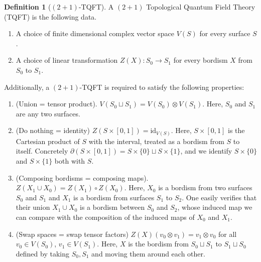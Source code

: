 \documentclass{article}
\theoremstyle{definition}
\newtheorem*{definition}{Definition}
\numberwithin{figure}{section}
\begin{document}
\begin{definition}[$(2+1)$-TQFT] A $(2+1)$ Topological Quantum Field Theory (TQFT) is the following data.
\begin{enumerate}
\item A choice of finite dimensional complex vector space $V(S)$ for every surface $S$.
\item A choice of linear transformation $Z(X): S_0\xrightarrow{} S_1$ for every bordism $X$ from $S_0$ to $S_1$.
\end{enumerate}
Additionally, a $(2+1)$-TQFT is required to satisfy the following properties:
\begin{enumerate}

\item (Union = tensor product). $V(S_0\sqcup S_1)=V(S_0)\otimes V(S_1)$. Here, $S_0$ and $S_1$ are any two surfaces.

\item (Do nothing = identity) $Z(S\times [0,1])=\text{id}_{V(S)}$. Here, $S\times [0,1]$ is the Cartesian product of $S$ with the interval, treated as a bordism from $S$ to itself. Concretely $\partial (S\times [0,1])=S\times\{0\}\sqcup S\times\{1\}$, and we identify $S\times \{0\}$ and $S\times\{1\}$ both with $S$.

\item (Composing bordisms = composing maps). $Z(X_1\cup X_0)=Z(X_1)\circ Z(X_0)$. Here, $X_0$ is a bordism from two surfaces $S_0$ and $S_1$ and $X_1$ is a bordism from surfaces $S_1$ to $S_2$. One easily verifies that their union $X_1\cup X_0$ is a bordism between $S_0$ and $S_2$, whose induced map we can compare with the composition of the induced maps of $X_0$ and $X_1$.

\item (Swap spaces = swap tensor factors) $Z(X)(v_0\otimes v_1)=v_1\otimes v_0$ for all $v_0\in V(S_0)$, $v_1\in V(S_1)$. Here, $X$ is the bordism from $S_0\sqcup S_1$ to $S_1\sqcup S_0$ defined by taking $S_0,S_1$ and moving them around each other.
\end{enumerate}

\end{definition}
\end{document}
